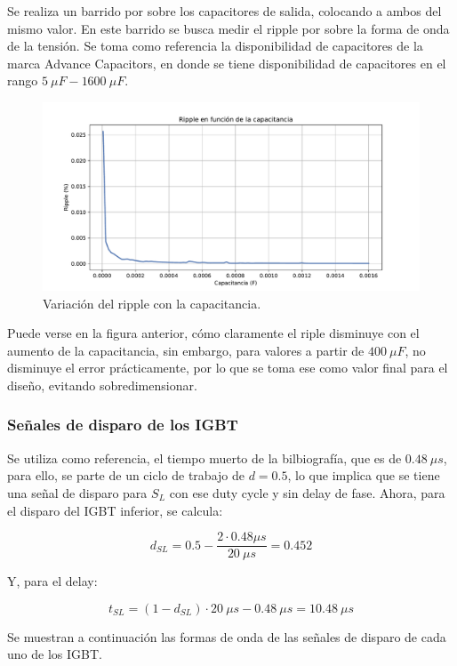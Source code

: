 Se realiza un barrido por sobre los capacitores de salida, colocando a ambos del mismo valor. En este barrido se busca medir el ripple por sobre la forma de onda de la tensión. Se toma como referencia la disponibilidad de capacitores de la marca Advance Capacitors, en donde se tiene disponibilidad de capacitores en el rango $5 \ \mu F - 1600 \ \mu F$.

\begin{figure}
	\centering
	\includegraphics[width=1\linewidth]{../ripple}
	\caption{Variación del ripple con la capacitancia.}
	\label{fig:ripple}
\end{figure}

Puede verse en la figura anterior, cómo claramente el riple disminuye con el aumento de la capacitancia, sin embargo, para valores a partir de $400 \ \mu F$, no disminuye el error prácticamente, por lo que se toma ese como valor final para el diseño, evitando sobredimensionar.

\subsubsection{Señales de disparo de los IGBT}

Se utiliza como referencia, el tiempo muerto de la bilbiografía, que es de $0.48 \ \mu s$, para ello, se parte de un ciclo de trabajo de $d=0.5$, lo que implica que se tiene una señal de disparo para $S_L$ con ese duty cycle y sin delay de fase. Ahora, para el disparo del IGBT inferior, se calcula:

$$d_{SL} = 0.5 - \frac{2\cdot 0.48 \mu s}{20 \ \mu s}=0.452$$

Y, para el delay:

$$t_{SL}=(1-d_{SL})\cdot 20 \ \mu s - 0.48 \ \mu s= 10.48 \ \mu s$$

Se muestran a continuación las formas de onda de las señales de disparo de cada uno de los IGBT. 


